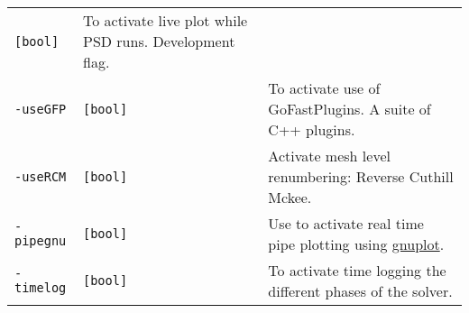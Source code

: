 \begin{longtable}[]{@{}lll@{}}
\begin{minipage}[t]{0.09\columnwidth}
\lstinline![bool]!\strut
\end{minipage} & \begin{minipage}[t]{0.56\columnwidth}\raggedright\strut
To activate live plot while PSD runs. Development flag.\strut
\end{minipage}\tabularnewline
\begin{minipage}[t]{0.26\columnwidth}\raggedright\strut
\lstinline!-useGFP!\strut
\end{minipage} & \begin{minipage}[t]{0.09\columnwidth}\raggedright\strut
\lstinline![bool]!\strut
\end{minipage} & \begin{minipage}[t]{0.56\columnwidth}\raggedright\strut
To activate use of GoFastPlugins. A suite of C++ plugins.\strut
\end{minipage}\tabularnewline
\begin{minipage}[t]{0.26\columnwidth}\raggedright\strut
\lstinline!-useRCM!\strut
\end{minipage} & \begin{minipage}[t]{0.09\columnwidth}\raggedright\strut
\lstinline![bool]!\strut
\end{minipage} & \begin{minipage}[t]{0.56\columnwidth}\raggedright\strut
Activate mesh level renumbering: Reverse Cuthill Mckee.\strut
\end{minipage}\tabularnewline
\begin{minipage}[t]{0.26\columnwidth}\raggedright\strut
\lstinline!-pipegnu!\strut
\end{minipage} & \begin{minipage}[t]{0.09\columnwidth}\raggedright\strut
\lstinline![bool]!\strut
\end{minipage} & \begin{minipage}[t]{0.56\columnwidth}\raggedright\strut
Use to activate real time pipe plotting using
\href{http://www.gnuplot.info/}{gnuplot}.\strut
\end{minipage}\tabularnewline
\begin{minipage}[t]{0.26\columnwidth}\raggedright\strut
\lstinline!-timelog!\strut
\end{minipage} & \begin{minipage}[t]{0.09\columnwidth}\raggedright\strut
\lstinline![bool]!\strut
\end{minipage} & \begin{minipage}[t]{0.56\columnwidth}\raggedright\strut
To activate time logging the different phases of the solver.\strut

\end{minipage}
\end{longtable}
